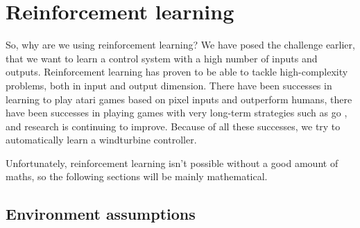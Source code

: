 \documentclass[hyperref,final,beleg]{cgvpub}
\begin{document}
\section{Reinforcement learning}

So, why are we using reinforcement learning? We have posed the challenge earlier, that we want to learn a control system with a high number of inputs and outputs. Reinforcement learning has proven to be able to tackle high-complexity problems, both in input and output dimension. There have been successes in learning to play atari games based on pixel inputs \cite{mnihPlayingAtariDeep2013} and outperform humans, there have been successes in playing games with very long-term strategies such as go \cite{silverMasteringGameGo2016}, and research is continuing to improve. Because of all these successes, we try to automatically learn a windturbine controller.

Unfortunately, reinforcement learning isn't possible without a good amount of maths, so the following sections will be mainly mathematical.

\subsection{Environment assumptions}
\end{document}
